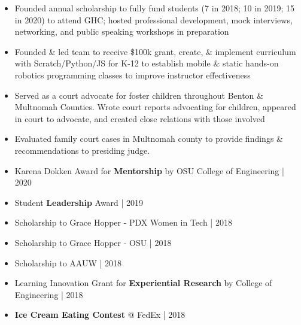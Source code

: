 \begin{itemize}
    \item{Founded annual scholarship to fully fund students (7 in 2018; 10 in 2019; 15 in 2020) to attend GHC; hosted professional development, mock interviews, networking, and public speaking workshops in preparation}
\end{itemize} \smallskip

\begin{itemize}
    \item {Founded \& led team to receive \$100k grant, create, \& implement curriculum with Scratch/Python/JS for K-12 to establish mobile \& static hands-on robotics programming classes to improve instructor effectiveness}
\end{itemize} \smallskip

\begin{itemize}
    \item {Served as a court advocate for foster children throughout Benton \& Multnomah Counties. Wrote court reports advocating for children, appeared in court to advocate, and created close relations with those involved}
\end{itemize}

\begin{itemize}
    \item {Evaluated family court cases in Multnomah county to provide findings \& recommendations to presiding judge.}
\end{itemize} \smallskip


\begin{itemize}
    \item{Karena Dokken Award for \textbf{Mentorship} by OSU College of Engineering | 2020}
    \item{Student \textbf{Leadership} Award | 2019}
    \item{Scholarship to Grace Hopper - PDX Women in Tech | 2018}
    \item{Scholarship to Grace Hopper - OSU | 2018}
    \item{Scholarship to AAUW | 2018}
    \item{Learning Innovation Grant for \textbf{Experiential Research} by College of Engineering | 2018}
    \item{\textbf{Ice Cream Eating Contest} @ FedEx | 2018}
\end{itemize}

